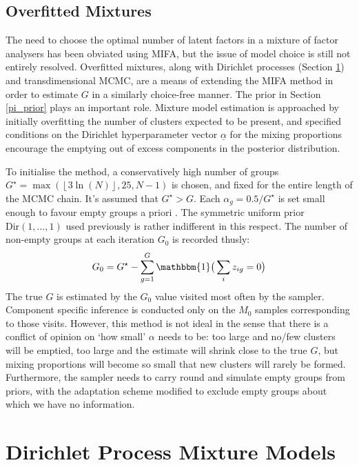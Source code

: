 \documentclass[a4paper,12pt,fleqn]{article}
\numberwithin{equation}{section}
\begin{document}
\subsection[Overfitted Mixtures]{Overfitted Mixtures}
The need to choose the optimal number of latent factors in a mixture of factor analysers has been obviated using MIFA, but the issue of model choice is still not entirely resolved. Overfitted mixtures, along with Dirichlet processes (Section \ref{Dirichlet}) and transdimensional MCMC, are a means of extending the MIFA method in order to estimate $G$ in a similarly choice-free manner. The prior in Section \ref{pi_prior}  plays an important role. Mixture model estimation is approached by initially overfitting the number of clusters expected to be present, and specified conditions on the Dirichlet hyperparameter vector $\underline{\alpha}$ for the  mixing proportions encourage the emptying out of excess components in the posterior distribution. 

To initialise the method, a conservatively high number of groups $G^\star = \max\left(\left\lfloor 3\ln(N)\right\rfloor, 25, N-1\right)$ is chosen, and fixed for the entire length of the MCMC chain. It's assumed that $G^\star > G$. Each $\alpha_g = 0.5/G^\star$ is set small enough to favour empty groups a priori \citep{Ishwaran2001}. The symmetric uniform prior $\textrm{Dir}\left(1,\ldots,1\right)$ used previously is rather indifferent in this respect. The number of non-empty groups at each iteration $G_0$ is recorded thusly:
\begin{equation}
	G_0 = G^{\star} - \sum_{g=1}^{G} \mathbbm{1}\big(\sum\limits_{i} z_{ig}=0\big)\label{eq:34}
\end{equation}
\label{overfitted}
The true $G$ is estimated by the $G_0$ value visited most often by the sampler. Component specific inference is conducted only on the $M_0$ samples corresponding to those visits. However, this method is not ideal in the sense that there is a conflict of opinion on `how small' $\alpha$ needs to be: too large and no/few clusters will be emptied, too large and the estimate will shrink close to the true $G$, but mixing proportions will become so small that new clusters will rarely be formed. Furthermore, the sampler needs to carry round and simulate empty groups from priors, with the adaptation scheme modified to exclude empty groups about which we have no information.

\section[Dirichlet Process Mixture Models]{Dirichlet Process Mixture Models}
\label{Dirichlet}
\end{document}
